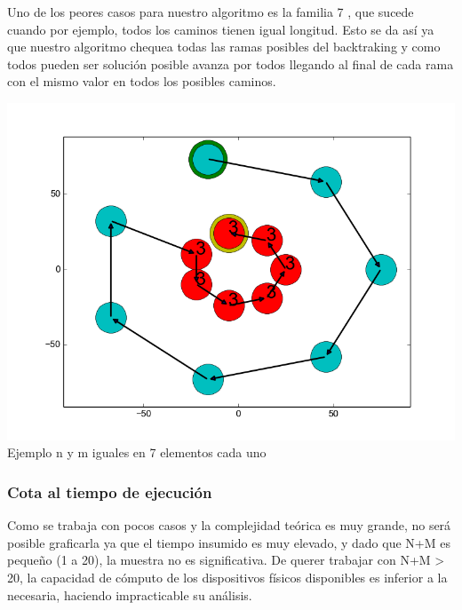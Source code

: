Uno de los peores casos para nuestro algoritmo es la familia 7 , que sucede cuando por ejemplo, todos los caminos tienen igual longitud. Esto se da as\'i ya que nuestro algoritmo chequea todas las ramas posibles del backtraking y como todos pueden ser soluci\'on posible avanza por todos llegando al final de cada rama con el mismo valor en todos los posibles caminos.\\

\vspace*{0.3cm} \vspace*{0.3cm}
  \begin{center}
 \includegraphics[scale=0.65]{./EJ1/anilloexacto.png}
 {Ejemplo n y m iguales en 7 elementos cada uno}
  \end{center}
  \vspace*{0.3cm}


 \subsubsection*{Cota al tiempo de ejecución}


Como se trabaja con pocos casos y la complejidad te\'orica es muy grande, no ser\'a posible graficarla ya que el tiempo insumido es muy elevado, y dado que N+M es pequeño (1 a 20), la muestra no es significativa. De querer trabajar con N+M > 20, la capacidad de cómputo de los dispositivos físicos disponibles es inferior a la necesaria, haciendo impracticable su análisis.



